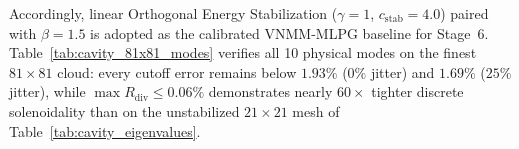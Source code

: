 \documentclass[VANCOUVER]{USG}
\begin{document}
Accordingly, linear Orthogonal Energy Stabilization ($\gamma = 1$, $c_{\mathrm{stab}} = 4.0$) paired with $\beta = 1.5$ is adopted as the calibrated VNMM-MLPG baseline for Stage~6. Table~\ref{tab:cavity_81x81_modes} verifies all 10 physical modes on the finest $81\times 81$ cloud: every cutoff error remains below $1.93\%$ ($0\%$ jitter) and $1.69\%$ ($25\%$ jitter), while $\max R_{\mathrm{div}} \le 0.06\%$ demonstrates nearly $60\times$ tighter discrete solenoidality than on the unstabilized $21\times 21$ mesh of Table~\ref{tab:cavity_eigenvalues}.

\begin{table}[!t]
    \centering
    \small
    \caption{Full 10-mode physical cavity spectrum on the finest $81 \times 81$ cloud ($6,241$ active DoFs, $h_{\mathrm{nom}} = 0.0393\text{ m}$) for the calibrated linear baseline ($\beta = 1.5$, $\gamma = 1$, $c_{\mathrm{stab}} = 4.0$, giving $s_{\mathrm{div}} = 120.00$ and $\alpha_{\mathrm{stab}} = 0.050$, $\alpha_s = 0.80$, $\text{seed}=42$) under $0\%$ and $25\%$ jitter.}
    \label{tab:cavity_81x81_modes}
\end{table}
\end{document}
